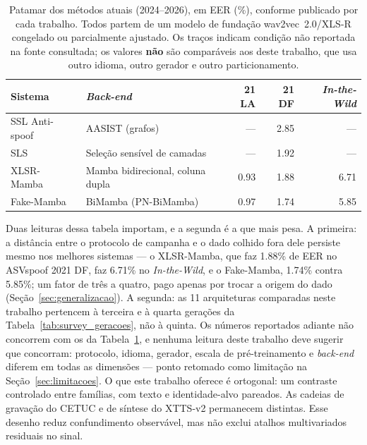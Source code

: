 \documentclass[12pt,a4paper]{article}
\begin{document}
\begin{table}[H]
	\centering
	\caption[Patamar dos métodos atuais (\num{2024}--\num{2026}), em EER.]{Patamar dos métodos atuais (\num{2024}--\num{2026}), em EER (\%),
		conforme publicado por cada trabalho. Todos partem de um modelo de fundação
		wav2vec~2.0/XLS-R congelado ou parcialmente ajustado. Os traços indicam
		condição não reportada na fonte consultada; os valores \textbf{não} são
		comparáveis aos deste trabalho, que usa outro idioma, outro gerador e outro
		particionamento.}
	\label{tab:metodos_atuais}
	\small\singlespacing
	\begin{tabular}{@{}l>{\raggedright\arraybackslash}p{3.9cm}rrr@{}}
		\toprule
		\textbf{Sistema} & \textbf{\textit{Back-end}} &
		\textbf{21 LA} & \textbf{21 DF} & \textbf{\textit{In-the-Wild}} \\
		\midrule
		SSL Anti-spoof~\cite{tak2022wav2vec} & AASIST (grafos) &
		--- & \num{2,85} & --- \\
		\addlinespace
		SLS~\cite{zhang2024sls} & Seleção sensível de camadas &
		--- & \num{1,92} & --- \\
		\addlinespace
		XLSR-Mamba~\cite{xiao2025xlsrmamba} & Mamba bidirecional, coluna dupla &
		\num{0,93} & \num{1,88} & \num{6,71} \\
		\addlinespace
		Fake-Mamba~\cite{xuan2025fakemamba} & BiMamba (PN-BiMamba) &
		\num{0,97} & \num{1,74} & \num{5,85} \\
		\bottomrule
	\end{tabular}
\end{table}

Duas leituras dessa tabela importam, e a segunda é a que mais pesa. A primeira:
a distância entre o protocolo de campanha e o dado colhido fora dele persiste
mesmo nos melhores sistemas --- o XLSR-Mamba, que faz \num{1,88}\% de EER no
ASVspoof 2021 DF, faz \num{6,71}\% no \textit{In-the-Wild}, e o Fake-Mamba,
\num{1,74}\% contra \num{5,85}\%; um fator de três a quatro, pago apenas por
trocar a origem do dado (Seção~\ref{sec:generalizacao}). A segunda: as
\num{11} arquiteturas comparadas neste trabalho pertencem à terceira e à quarta
gerações da Tabela~\ref{tab:survey_geracoes}, não à quinta. Os números
reportados adiante não concorrem com os da Tabela~\ref{tab:metodos_atuais}, e
nenhuma leitura deste trabalho deve sugerir que concorram: protocolo, idioma,
gerador, escala de pré-treinamento e \textit{back-end} diferem em todas as
dimensões --- ponto retomado como limitação na Seção~\ref{sec:limitacoes}. O
que este trabalho oferece é ortogonal: um contraste controlado entre famílias,
com texto e identidade-alvo pareados. As cadeias de gravação do CETUC e de
síntese do XTTS-v2 permanecem distintas. Esse desenho reduz confundimento
observável, mas não exclui atalhos
multivariados residuais no sinal.
\end{document}
